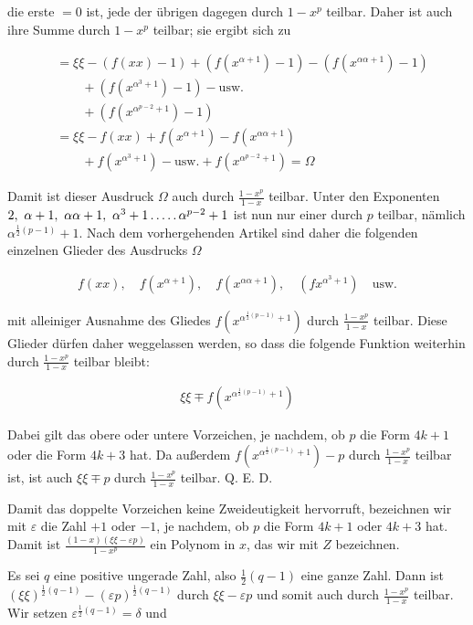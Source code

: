 die erste $=0$ ist, jede der übrigen dagegen durch $1-x^p$ teilbar. Daher ist auch ihre Summe durch $1-x^p$ teilbar; sie ergibt sich zu

\[
\begin{aligned}
&=\xi\xi-(f(xx)-1)+(f(x^{\alpha+1})-1)-(f(x^{\alpha\alpha+1})-1)\\&\qquad+(f(x^{\alpha^3+1})-1)-\text{usw.}\\
&\qquad+(f(x^{\alpha^{p-2}+1})-1)\\
&=\xi\xi-f(xx)+f(x^{\alpha+1})-f(x^{\alpha\alpha+1})\\&\qquad+f(x^{\alpha^3+1})-\text{usw.}+f(x^{\alpha^{p-2}+1})=\Omega
\end{aligned}
\]

Damit ist dieser Ausdruck $\Omega$ auch durch $\frac{1-x^p}{1-x}$ teilbar. Unter den Exponenten $2,\ \alpha+1,\ \alpha\alpha+1,\ \alpha^3+1\dotsfive\alpha^{p-2}+1$ ist nun nur einer durch $p$ teilbar, nämlich $\alpha^{\frac12(p-1)}+1$. Nach dem vorhergehenden Artikel sind daher die folgenden einzelnen Glieder des Ausdrucks $\Omega$

\[
\begin{aligned}
f(xx),\quad f(x^{\alpha+1}),\quad f(x^{\alpha\alpha+1}),\quad (fx^{\alpha^3+1})\quad\text{usw.}
\end{aligned}
\]

mit alleiniger Ausnahme des Gliedes $f(x^{\alpha^{\frac12(p-1)}+1})$ durch $\frac{1-x^p}{1-x}$ teilbar. Diese Glieder dürfen daher weggelassen werden, so dass die folgende Funktion weiterhin durch $\frac{1-x^p}{1-x}$ teilbar bleibt:

\[
\begin{aligned}
\xi\xi\mp f(x^{\alpha^{\frac12(p-1)}+1})
\end{aligned}
\]

 Dabei gilt das obere oder untere Vorzeichen, je nachdem, ob $p$ die Form $4k+1$ oder die Form $4k+3$ hat. Da außerdem $f(x^{\alpha^{\frac12(p-1)}+1})-p$ durch $\frac{1-x^p}{1-x}$ teilbar ist, ist auch $\xi\xi\mp p$ durch $\frac{1-x^p}{1-x}$ teilbar. Q. E. D.

Damit das doppelte Vorzeichen keine Zweideutigkeit hervorruft, bezeichnen wir mit $\varepsilon$ die Zahl $+1$ oder $-1$, je nachdem, ob $p$ die Form $4k+1$ oder $4k+3$ hat. Damit ist $\frac{(1-x)(\xi\xi-\varepsilon p)}{1-x^p}$ ein Polynom in $x$, das wir mit $Z$ bezeichnen.


Es sei $q$ eine positive ungerade Zahl, also $\frac12(q-1)$ eine ganze Zahl. Dann ist $(\xi\xi)^{\frac12(q-1)}-(\varepsilon p)^{\frac12(q-1)}$ durch $\xi\xi-\varepsilon p$ und somit auch durch $\frac{1-x^p}{1-x}$ teilbar. Wir setzen $\varepsilon^{\frac12(q-1)}=\delta$ und

